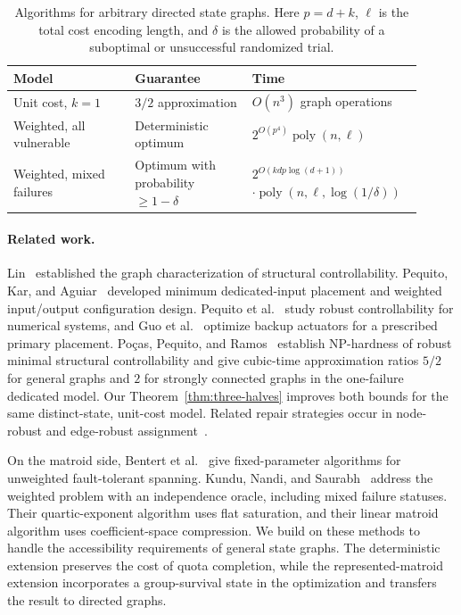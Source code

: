 \documentclass[11pt]{article}
\theoremstyle{definition}
\theoremstyle{remark}\newtheorem{remark}[theorem]{Remark}
\begin{document}
\begin{table}[htbp]
\centering\small
\caption{Algorithms for arbitrary directed state graphs. Here
$p=d+k$, $\ell$ is the total cost encoding length, and $\delta$ is the allowed
probability of a suboptimal or unsuccessful randomized trial.}
\label{tab:results}
\begin{tabular}{@{}p{0.29\linewidth}p{0.27\linewidth}p{0.35\linewidth}@{}}
\toprule
Model & Guarantee & Time \\
\midrule
Unit cost, $k=1$ & $3/2$ approximation & $O(n^3)$ graph operations \\
Weighted, all vulnerable & Deterministic optimum & $2^{O(p^4)}\operatorname{poly}(n,\ell)$ \\
Weighted, mixed failures & Optimum with probability $\ge 1-\delta$ &
$2^{O(kdp\log(d+1))}$\newline$\cdot\operatorname{poly}(n,\ell,\log(1/\delta))$ \\
\bottomrule
\end{tabular}
\end{table}

\paragraph{Related work.}
Lin~\cite{Lin} established the graph characterization of structural
controllability. Pequito, Kar, and Aguiar~\cite{PKA,PKAcost} developed
minimum dedicated-input placement and weighted input/output
configuration design. Pequito et al.~\cite{PRKAP} study robust
controllability for numerical systems, and Guo et al.~\cite{GuoBackup}
optimize backup actuators for a prescribed primary placement.
Po\c{c}as, Pequito, and Ramos~\cite{PPR} establish NP-hardness of
robust minimal structural controllability and give cubic-time
approximation ratios $5/2$ for general graphs and $2$ for strongly
connected graphs in the one-failure dedicated model. Our
Theorem~\ref{thm:three-halves} improves both bounds for the same
distinct-state, unit-cost model. Related repair strategies occur
in node-robust and edge-robust assignment~\cite{ABMnodes,ABMedges}.

On the matroid side, Bentert et al.~\cite{BFGL} give fixed-parameter
algorithms for unweighted fault-tolerant spanning. Kundu, Nandi,
and Saurabh~\cite{KNS} address the weighted problem with an
independence oracle, including mixed failure statuses. Their
quartic-exponent algorithm uses flat saturation, and their linear
matroid algorithm uses coefficient-space compression. We build on
these methods to handle the accessibility requirements of
general state graphs. The deterministic extension preserves the
cost of quota completion, while the represented-matroid extension
incorporates a group-survival state in the optimization and
transfers the result to directed graphs.
\end{document}
